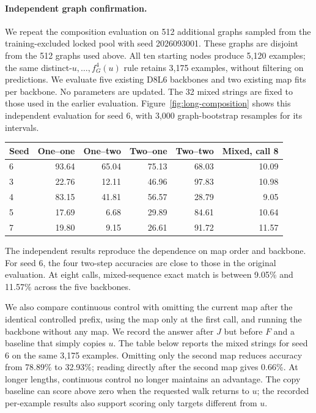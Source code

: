 \documentclass{article}
\begin{document}
\paragraph{Independent graph confirmation.}
We repeat the composition evaluation on 512 additional graphs sampled from the training-excluded locked pool with seed 2026093001. These graphs are disjoint from the 512 graphs used above. All ten starting nodes produce 5,120 examples; the same distinct-$u,\ldots,f_G^4(u)$ rule retains 3,175 examples, without filtering on predictions. We evaluate five existing D8L6 backbones and two existing map fits per backbone. No parameters are updated. The 32 mixed strings are fixed to those used in the earlier evaluation. Figure~\ref{fig:long-composition} shows this independent evaluation for seed 6, with 3,000 graph-bootstrap resamples for its intervals.

\begin{center}\begin{minipage}{\linewidth}\centering
\captionsetup{hypcap=false}
\begin{tabular}{lrrrrr}\toprule
Seed & One--one & One--two & Two--one & Two--two & Mixed, call 8\\\midrule
6 & 93.64 & 65.04 & 75.13 & 68.03 & 10.09 \\
3 & 22.76 & 12.11 & 46.96 & 97.83 & 10.98 \\
4 & 83.15 & 41.81 & 56.57 & 28.79 & 9.05 \\
5 & 17.69 & 6.68 & 29.89 & 84.61 & 10.64 \\
7 & 19.80 & 9.15 & 26.61 & 91.72 & 11.57 \\
\bottomrule\end{tabular}\end{minipage}\end{center}

The independent results reproduce the dependence on map order and backbone. For seed 6, the four two-step accuracies are close to those in the original evaluation. At eight calls, mixed-sequence exact match is between 9.05\% and 11.57\% across the five backbones.

We also compare continuous control with omitting the current map after the identical controlled prefix, using the map only at the first call, and running the backbone without any map. We record the answer after $J$ but before $F$ and a baseline that simply copies $u$. The table below reports the mixed strings for seed 6 on the same 3,175 examples. Omitting only the second map reduces accuracy from 78.89\% to 32.93\%; reading directly after the second map gives 0.66\%. At longer lengths, continuous control no longer maintains an advantage. The copy baseline can score above zero when the requested walk returns to $u$; the recorded per-example results also support scoring only targets different from $u$.
\end{document}
